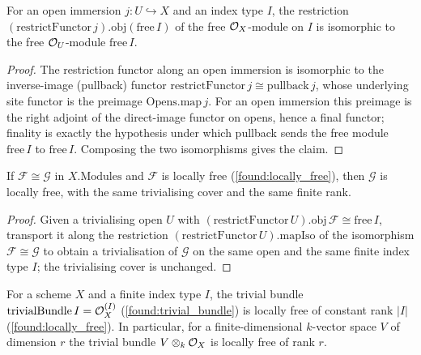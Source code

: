 \begin{lemma}
  \label{found:restrict_free_iso}
  For an open immersion \(j:U\hookrightarrow X\) and an index type \(I\), the
  restriction \((\mathrm{restrictFunctor}\,j).\mathrm{obj}(\mathrm{free}\,I)\) of the
  free \(\mathcal{O}_X\)-module on \(I\) is isomorphic to the free \(\mathcal{O}_U\)-module
  \(\mathrm{free}\,I\).
\end{lemma}

\begin{proof}
  \leanok
  The restriction functor along an open immersion is isomorphic to the inverse-image
  (pullback) functor \(\mathrm{restrictFunctor}\,j\cong\mathrm{pullback}\,j\), whose
  underlying site functor is the preimage \(\mathrm{Opens.map}\,j\).  For an open
  immersion this preimage is the right adjoint of the direct-image functor on opens,
  hence a final functor; finality is exactly the hypothesis under which pullback sends
  the free module \(\mathrm{free}\,I\) to \(\mathrm{free}\,I\).  Composing the two
  isomorphisms gives the claim.
\end{proof}

\begin{lemma}
  \label{found:locally_free_of_iso}
  If \(\mathcal F\cong\mathcal G\) in \(X.\mathrm{Modules}\) and \(\mathcal F\) is
  locally free (\cref{found:locally_free}), then \(\mathcal G\) is locally free, with the
  same trivialising cover and the same finite rank.
\end{lemma}

\begin{proof}
  \leanok
  Given a trivialising open \(U\) with \((\mathrm{restrictFunctor}\,U).\mathrm{obj}\,
  \mathcal F\cong\mathrm{free}\,I\), transport it along the restriction
  \((\mathrm{restrictFunctor}\,U).\mathrm{mapIso}\) of the isomorphism
  \(\mathcal F\cong\mathcal G\) to obtain a trivialisation of \(\mathcal G\) on the same
  open and the same finite index type \(I\); the trivialising cover is unchanged.
\end{proof}

\begin{lemma}
  \label{found:trivial_bundle_locally_free}
  For a scheme \(X\) and a finite index type \(I\), the trivial bundle
  \(\mathrm{trivialBundle}\,I=\mathcal{O}_X^{(I)}\) (\cref{found:trivial_bundle}) is locally
  free of constant rank \(|I|\) (\cref{found:locally_free}).  In particular, for a
  finite-dimensional \(k\)-vector space \(V\) of dimension \(r\) the trivial bundle
  \(V\otimes_k\mathcal{O}_X\) is locally free of rank \(r\).
\end{lemma}

